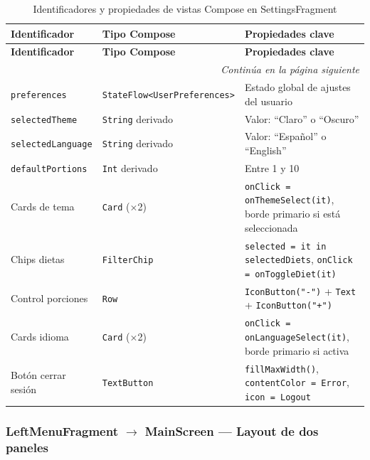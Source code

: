 \documentclass[stu, 12pt, letterpaper, donotrepeattitle, floatsintext, natbib]{apa7}
\begin{document}
\begin{longtable}{@{}p{2.5cm}p{4cm}p{9cm}@{}}
\caption{Identificadores y propiedades de vistas Compose en SettingsFragment}
\label{tab:idsettings}\\
\toprule
\textbf{Identificador} & \textbf{Tipo Compose} & \textbf{Propiedades clave} \\
\midrule
\endfirsthead
\toprule
\textbf{Identificador} & \textbf{Tipo Compose} & \textbf{Propiedades clave} \\
\midrule
\endhead
\midrule
\multicolumn{3}{r}{\small\textit{Continúa en la página siguiente}}\\
\endfoot
\bottomrule
\endlastfoot
\texttt{preferences} & \texttt{StateFlow<UserPreferences>} & Estado global de ajustes del usuario \\[3pt]
\texttt{selectedTheme} & \texttt{String} derivado & Valor: ``Claro'' o ``Oscuro'' \\[3pt]
\texttt{selectedLanguage} & \texttt{String} derivado & Valor: ``Español'' o ``English'' \\[3pt]
\texttt{defaultPortions} & \texttt{Int} derivado & Entre 1 y 10 \\[3pt]
Cards de tema & \texttt{Card} ($\times$2) & \texttt{onClick = onThemeSelect(it)}, borde primario si está seleccionada \\[3pt]
Chips dietas & \texttt{FilterChip} & \texttt{selected = it in selectedDiets}, \texttt{onClick = onToggleDiet(it)} \\[3pt]
Control porciones & \texttt{Row} & \texttt{IconButton("-")} + \texttt{Text} + \texttt{IconButton("+")} \\[3pt]
Cards idioma & \texttt{Card} ($\times$2) & \texttt{onClick = onLanguageSelect(it)}, borde primario si activa \\[3pt]
Botón cerrar sesión & \texttt{TextButton} & \texttt{fillMaxWidth()}, \texttt{contentColor = Error}, \texttt{icon = Logout} \\
\end{longtable}

\subsubsection{LeftMenuFragment $\rightarrow$ MainScreen --- Layout de dos paneles}
\end{document}

